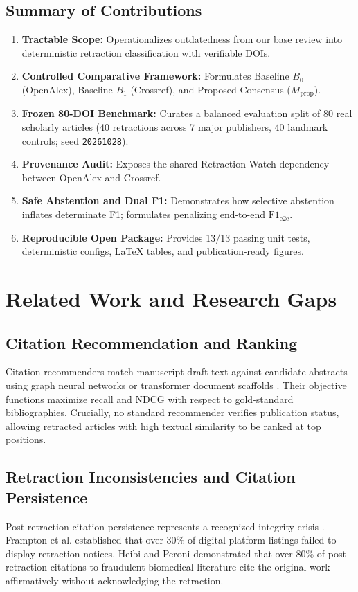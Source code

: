 \documentclass[10pt,a4paper,twocolumn]{article}
\begin{document}
\subsection{Summary of Contributions}
\begin{enumerate}
    \item \textbf{Tractable Scope:} Operationalizes outdatedness from our base review into deterministic retraction classification with verifiable DOIs.
    \item \textbf{Controlled Comparative Framework:} Formulates Baseline $B_0$ (OpenAlex), Baseline $B_1$ (Crossref), and Proposed Consensus ($M_{\text{prop}}$).
    \item \textbf{Frozen 80-DOI Benchmark:} Curates a balanced evaluation split of 80 real scholarly articles (40 retractions across 7 major publishers, 40 landmark controls; seed \texttt{20261028}).
    \item \textbf{Provenance Audit:} Exposes the shared Retraction Watch dependency between OpenAlex and Crossref.
    \item \textbf{Safe Abstention and Dual F1:} Demonstrates how selective abstention inflates determinate F1; formulates penalizing end-to-end $\text{F1}_{\text{e2e}}$.
    \item \textbf{Reproducible Open Package:} Provides 13/13 passing unit tests, deterministic configs, LaTeX tables, and publication-ready figures.
\end{enumerate}

\section{Related Work and Research Gaps}

\subsection{Citation Recommendation and Ranking}
Citation recommenders match manuscript draft text against candidate abstracts using graph neural networks or transformer document scaffolds \cite{jatowt2023mining, cohan2019structural}. Their objective functions maximize recall and NDCG with respect to gold-standard bibliographies. Crucially, no standard recommender verifies publication status, allowing retracted articles with high textual similarity to be ranked at top positions.

\subsection{Retraction Inconsistencies and Citation Persistence}
Post-retraction citation persistence represents a recognized integrity crisis \cite{vannoorden2011science, brainard2018rethinking}. Frampton et al. \cite{frampton2021inconsistent} established that over 30\% of digital platform listings failed to display retraction notices. Heibi and Peroni \cite{heibi2021qualitative} demonstrated that over 80\% of post-retraction citations to fraudulent biomedical literature cite the original work affirmatively without acknowledging the retraction.
\end{document}
